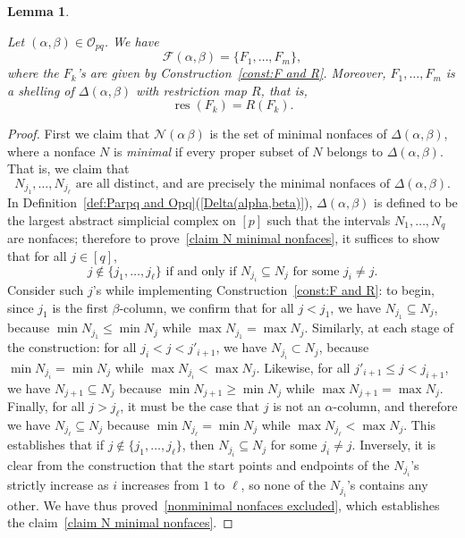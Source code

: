 \documentclass[noamsfonts,10pt]{amsart}
\newcommand{\NN}{\mathcal{N}}
\newcommand{\al}{\alpha}
\newcommand{\be}{\beta}
\renewcommand{\O}{\mathcal{O}}
\newcommand{\F}{\mathcal{F}}
\newcommand{\res}{\operatorname{res}}
\newcommand{\1}{\mathbf{1}}
\theoremstyle{plain}
\newtheorem{lemma}[theorem]{Lemma}
\theoremstyle{definition}
\numberwithin{equation}{section}
\begin{document}
\begin{lemma}
\label{lemma:F and R}
    
    Let $(\al, \be) \in \O_{pq}$.
    We have
    \[
        \F(\al,\be) = \{F_1, \ldots, F_m \},
    \]
    where the $F_k$'s are given by Construction~\ref{const:F and R}.
    Moreover, $F_1, \ldots, F_m$ is a shelling of $\Delta(\al, \be)$ with restriction map $R$, that is,
    \[
        \res(F_k) = R(F_k).
    \]       
\end{lemma}

\begin{proof}
    First we claim that $\NN(\al\,\be)$ is the set of minimal nonfaces of $\Delta(\al,\be)$, where a nonface $N$ is \emph{minimal} if every proper subset of $N$ belongs to $\Delta(\al,\be)$.
    That is, we claim that
    \begin{equation}
        \label{claim N minimal nonfaces}
        \text{$N_{j_1}, \ldots, N_{j_\ell}$ are all distinct, and are precisely the minimal nonfaces of $\Delta(\al,\be)$}.
    \end{equation}
    In Definition~\ref{def:Parpq and Opq}(\ref{Delta(alpha,beta)}), $\Delta(\al,\be)$ is defined to be the largest abstract simplicial complex on $[p]$ such that the intervals $N_1, \ldots, N_q$ are nonfaces;
    therefore to prove~\eqref{claim N minimal nonfaces}, it suffices to show that for all $j \in [q]$,
    \begin{equation}
        \label{nonminimal nonfaces excluded}
        j \notin \{j_1, \ldots, j_\ell\} \text{ if and only if $N_{j_i} \subseteq N_j$ for some $j_i \neq j$}.
    \end{equation}
    Consider such $j$'s while implementing Construction~\ref{const:F and R}:
    to begin, since $j_1$ is the first $\be$-column, we confirm that for all $j < j_1$, we have $N_{j_1} \subseteq N_j$, because $\min N_{j_1} \leq \min N_{j}$ while $\max N_{j_1} = \max N_j$.
    Similarly, at each stage of the construction:
    for all $j_i < j < j'_{i+1}$, we have $N_{j_i} \subset N_j$, because $\min N_{j_i} = \min N_j$ while $\max N_{j_i} < \max N_j$.
    Likewise, for all $j'_{i+1} \leq j < j_{i+1}$, we have $N_{j+1} \subseteq N_j$ because $\min N_{j+1} \geq \min N_j$ while $\max N_{j+1} = \max N_j$.
    Finally, for all $j > j_\ell$, it must be the case that $j$ is not an $\al$-column, and therefore we have $N_{j_\ell} \subseteq N_j$ because $\min N_{j_\ell} = \min N_j$ while $\max N_{j_\ell} < \max N_j$.
    This establishes that if $j \notin \{j_1, \ldots, j_\ell\}$, then $N_{j_i} \subseteq N_j$ for some $j_i \neq j$.
    Inversely, it is clear from the construction that the start points and endpoints of the $N_{j_i}$'s strictly increase as $i$ increases from $1$ to $\ell$, so none of the $N_{j_i}$'s contains any other.
    We have thus proved~\eqref{nonminimal nonfaces excluded}, which establishes the claim~\eqref{claim N minimal nonfaces}.


\end{proof}
\end{document}
